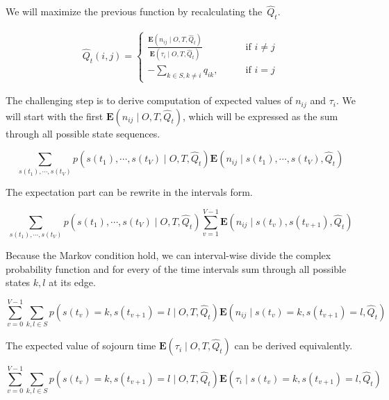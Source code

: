 \documentclass[thesis=M,english]{FITthesis}[2012/10/20]
\begin{document}
We will maximize the previous function by recalculating the~$\hat Q_t$. 

\begin{equation}
\begin{aligned}  
\hat Q_t(i,j)= 
\begin{cases}
\frac{ \mathbf{E}(n_{ij} \mid O,T, \hat Q_t )}{ \mathbf{E}( \tau_i \mid O,T, \hat Q_t ) } & \text{if } i\neq j\\
- \sum\limits_{k \in S ,k \neq i} q_{ik}, \qquad & \text{if } i=j
\end{cases}
\end{aligned}
\end{equation}

The challenging step is to derive computation of expected values of $n_{ij}$ and $\tau_i$. We will start with the first $\mathbf{E}(n_{ij} \mid O,T, \hat Q_t )$, which will be expressed as the sum through all possible state sequences.

\begin{equation} 
\sum_{s(t_1),\cdots,s(t_V)} p(s(t_1),\cdots,s(t_V) \mid O,T, \hat Q_t) \mathbf{E}(n_{ij} \mid s(t_1),\cdots,s(t_V) ,\hat Q_t )
\end{equation}

The expectation part can be rewrite in the intervals form.  

\begin{equation}
 \sum_{s(t_1),\cdots,s(t_V)} p(s(t_1),\cdots,s(t_V) \mid O,T, \hat Q_t) \sum_{v=1}^{V-1}\mathbf{E}(n_{ij} \mid s(t_v),s(t_{v+1}) ,\hat Q_t )
\end{equation}

Because the Markov condition hold, we can interval-wise divide the complex probability function and for every of the time intervals sum through all possible states $k,l$ at its edge. 

\begin{equation}
\sum_{v=0}^{V-1} \sum_{k,l \in S} p(s(t_v) = k,s(t_{v+1}) = l \mid O,T, \hat Q_t) \mathbf{E}(n_{ij} \mid s(t_v) = k,s(t_{v+1}) = l,\hat Q_t )
\end{equation}

The expected value of sojourn time $\mathbf{E}( \tau_i \mid O,T, \hat Q_t )$ can be derived equivalently.

\begin{equation}
\sum_{v=0}^{V-1} \sum_{k,l \in S} p(s(t_v) = k,s(t_{v+1}) = l \mid O,T, \hat Q_t) \mathbf{E}(\tau_i \mid s(t_v) = k,s(t_{v+1}) = l,\hat Q_t )
\end{equation}
\end{document}
